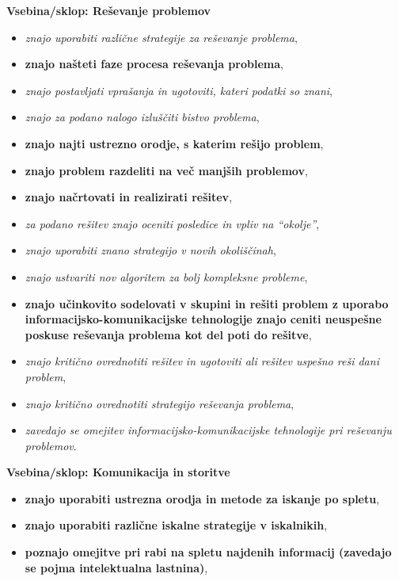 \textbf{Vsebina/sklop: Reševanje problemov}
\begin{itemize}
\tightlist
\item \emph{znajo uporabiti različne strategije za reševanje problema},
\item \textbf{znajo našteti faze procesa reševanja problema},
\item \emph{znajo postavljati vprašanja in ugotoviti, kateri podatki so
  znani},
\item \emph{znajo za podano nalogo izluščiti bistvo problema},
\item \textbf{znajo najti ustrezno orodje, s katerim rešijo problem},
\item \textbf{znajo problem razdeliti na več manjših problemov},
\item \textbf{znajo načrtovati in realizirati rešitev},
\item \emph{za podano rešitev znajo oceniti posledice in vpliv na ``okolje''},
\item \emph{znajo uporabiti znano strategijo v novih okoliščinah},
\item \emph{znajo ustvariti nov algoritem za bolj kompleksne probleme},
\item \textbf{znajo učinkovito sodelovati v skupini in rešiti problem
    z uporabo informacijsko-komunikacijske tehnologije znajo ceniti
    neuspešne poskuse reševanja problema kot del poti do rešitve},
\item \emph{znajo kritično ovrednotiti rešitev in ugotoviti ali rešitev
  uspešno reši dani problem},
\item \emph{znajo kritično ovrednotiti strategijo reševanja problema},
\item \emph{zavedajo se omejitev informacijsko-komunikacijske tehnologije
  pri reševanju problemov}.
\end{itemize}

\textbf{Vsebina/sklop: Komunikacija in storitve}
\begin{itemize}
\tightlist
\item \textbf{znajo uporabiti ustrezna orodja in metode za iskanje po spletu},
\item \textbf{znajo uporabiti različne iskalne strategije v iskalnikih},
\item \textbf{poznajo omejitve pri rabi na spletu najdenih informacij
  (zavedajo se pojma intelektualna lastnina)},
\end{itemize}

